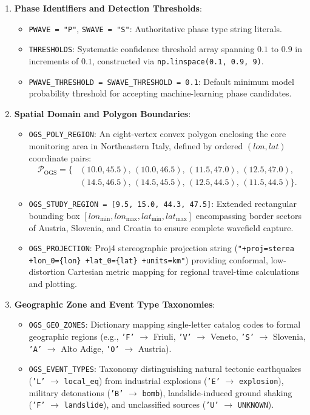 \begin{enumerate}
  \item \textbf{Phase Identifiers and Detection Thresholds}:
  \begin{itemize}
    \item \texttt{PWAVE = "P"}, \texttt{SWAVE = "S"}: Authoritative phase type string literals.
    \item \texttt{THRESHOLDS}: Systematic confidence threshold array spanning $0.1$ to $0.9$ in increments of $0.1$, constructed via \texttt{np.linspace(0.1, 0.9, 9)}.
    \item \texttt{PWAVE\_THRESHOLD = SWAVE\_THRESHOLD = 0.1}: Default minimum model probability threshold for accepting machine-learning phase candidates.
  \end{itemize}

  \item \textbf{Spatial Domain and Polygon Boundaries}:
  \begin{itemize}
    \item \texttt{OGS\_POLY\_REGION}: An eight-vertex convex polygon enclosing the core monitoring area in Northeastern Italy, defined by ordered $(lon, lat)$ coordinate pairs:
    \begin{align}
      \mathcal{P}_{\mathrm{OGS}} = \{ &(10.0, 45.5),\, (10.0, 46.5),\, (11.5, 47.0),\, (12.5, 47.0), \nonumber \\
                                      &(14.5, 46.5),\, (14.5, 45.5),\, (12.5, 44.5),\, (11.5, 44.5) \}.
      \label{eq:ogs_poly_coords}
    \end{align}
    \item \texttt{OGS\_STUDY\_REGION = [9.5, 15.0, 44.3, 47.5]}: Extended rectangular bounding box $[lon_{\min}, lon_{\max}, lat_{\min}, lat_{\max}]$ encompassing border sectors of Austria, Slovenia, and Croatia to ensure complete wavefield capture.
    \item \texttt{OGS\_PROJECTION}: Proj4 stereographic projection string (\texttt{"+proj=sterea +lon\_0=\{lon\} +lat\_0=\{lat\} +units=km"}) providing conformal, low-distortion Cartesian metric mapping for regional travel-time calculations and plotting.
  \end{itemize}

  \item \textbf{Geographic Zone and Event Type Taxonomies}:
  \begin{itemize}
    \item \texttt{OGS\_GEO\_ZONES}: Dictionary mapping single-letter catalog codes to formal geographic regions (e.g., \texttt{'F'} $\to$ Friuli, \texttt{'V'} $\to$ Veneto, \texttt{'S'} $\to$ Slovenia, \texttt{'A'} $\to$ Alto Adige, \texttt{'O'} $\to$ Austria).
    \item \texttt{OGS\_EVENT\_TYPES}: Taxonomy distinguishing natural tectonic earthquakes (\texttt{'L'} $\to$ \texttt{local\_eq}) from industrial explosions (\texttt{'E'} $\to$ \texttt{explosion}), military detonations (\texttt{'B'} $\to$ \texttt{bomb}), landslide-induced ground shaking (\texttt{'F'} $\to$ \texttt{landslide}), and unclassified sources (\texttt{'U'} $\to$ \texttt{UNKNOWN}).
  \end{itemize}


\end{enumerate}
